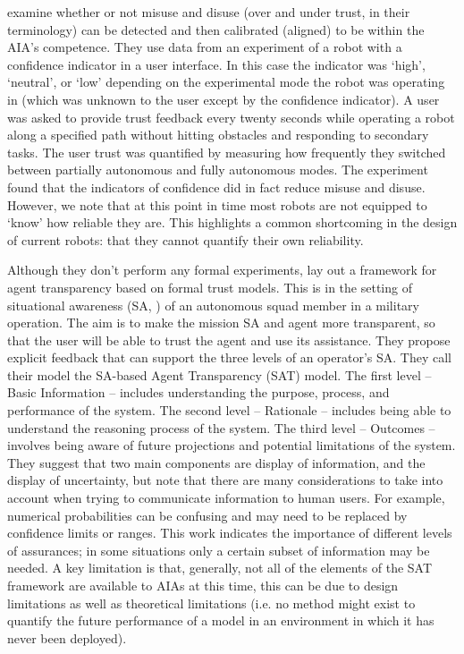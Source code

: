 \citet{Kaniarasu2013-ho} examine whether or not misuse and disuse (over and under trust, in their terminology) can be detected and then calibrated (aligned) to be within the AIA's competence. They use data from an experiment of a robot with a confidence indicator in a user interface. In this case the indicator was `high', `neutral', or `low' depending on the experimental mode the robot was operating in (which was unknown to the user except by the confidence indicator). A user was asked to provide trust feedback every twenty seconds while operating a robot along a specified path without hitting obstacles and responding to secondary tasks. The user trust was quantified by measuring how frequently they switched between partially autonomous and fully autonomous modes. The experiment found that the indicators of confidence did in fact reduce misuse and disuse. However, we note that at this point in time most robots are not equipped to `know' how reliable they are. This highlights a common shortcoming in the design of current robots: that they cannot quantify their own reliability.

Although they don't perform any formal experiments, \citet{Chen2014-dk} lay out a framework for agent transparency based on formal trust models. This is in the setting of situational awareness (SA, \cite{Endsley1995-ie}) of an autonomous squad member in a military operation. The aim is to make the mission SA and agent more transparent, so that the user will be able to trust the agent and use its assistance. They propose explicit feedback that can support the three levels of an operator's SA. They call their model the SA-based Agent Transparency (SAT) model. The first level -- Basic Information -- includes understanding the purpose, process, and performance of the system. The second level -- Rationale -- includes being able to understand the reasoning process of the system. The third level -- Outcomes -- involves being aware of future projections and potential limitations of the system. They suggest that two main components are display of information, and the display of uncertainty, but note that there are many considerations to take into account when trying to communicate information to human users. For example, numerical probabilities can be confusing and may need to be replaced by confidence limits or ranges. This work indicates the importance of different levels of assurances; in some situations only a certain subset of information may be needed. A key limitation is that, generally, not all of the elements of the SAT framework are available to AIAs at this time, this can be due to design limitations as well as theoretical limitations (i.e. no method might exist to quantify the future performance of a model in an environment in which it has never been deployed).


